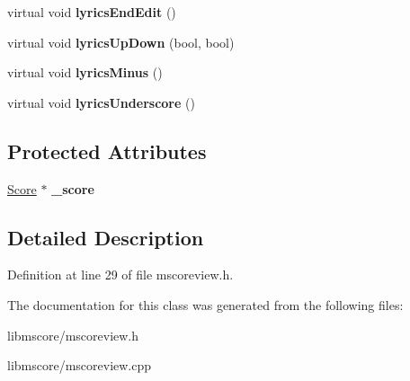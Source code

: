 \begin{DoxyCompactItemize}
\mbox{\label{class_ms_1_1_muse_score_view_ac0b7e4335657db836fdc952000141b6d}} 
virtual void {\bfseries lyrics\+End\+Edit} ()
\item 
\mbox{\label{class_ms_1_1_muse_score_view_a92d7a4e6aeb1a60261efba1ec3022d2d}} 
virtual void {\bfseries lyrics\+Up\+Down} (bool, bool)
\item 
\mbox{\label{class_ms_1_1_muse_score_view_a8bacd78170bd87e91d63fd55a6025322}} 
virtual void {\bfseries lyrics\+Minus} ()
\item 
\mbox{\label{class_ms_1_1_muse_score_view_ab4a327b08bb4022a09de8b8e6930b093}} 
virtual void {\bfseries lyrics\+Underscore} ()
\end{DoxyCompactItemize}
\subsection*{Protected Attributes}
\begin{DoxyCompactItemize}
\item 
\mbox{\label{class_ms_1_1_muse_score_view_aa2cd78d926357a2c03d7a537ab5c3ad9}} 
\hyperlink{class_ms_1_1_score}{Score} $\ast$ {\bfseries \+\_\+score}
\end{DoxyCompactItemize}


\subsection{Detailed Description}


Definition at line 29 of file mscoreview.\+h.



The documentation for this class was generated from the following files\+:\begin{DoxyCompactItemize}
\item 
libmscore/mscoreview.\+h\item 
libmscore/mscoreview.\+cpp\end{DoxyCompactItemize}
